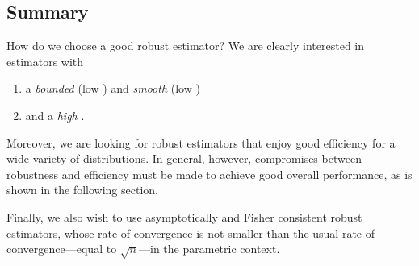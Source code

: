 
\subsection{Summary}

How do we choose a good robust estimator? We are clearly interested in estimators with

\begin{enumerate}
    \item a \emph{bounded} (low )
    and \emph{smooth} (low ) \emph{} 

    \item and a \emph{high }.
\end{enumerate}

Moreover, we are looking for robust estimators that enjoy good efficiency for
a wide variety of distributions. In general, however, compromises between
robustness and efficiency must be made to achieve good overall performance, as
is shown in the following section.

Finally, we also wish to use asymptotically and Fisher consistent robust
estimators, whose rate of convergence is not smaller than the usual rate of
convergence---equal to $\sqrt{n}$---in the parametric context.


\endinput
